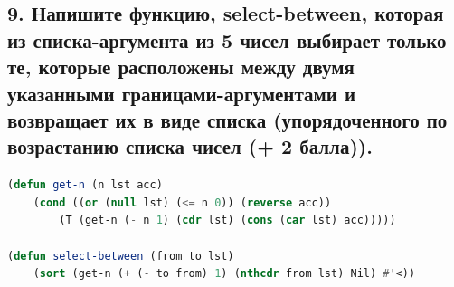 \documentclass[12pt]{report}
\begin{document}
\subsection*{9. Напишите функцию, select-between, которая из списка-аргумента из 5 чисел выбирает
	только те, которые расположены между двумя указанными границами-аргументами и
	возвращает их в виде списка (упорядоченного по возрастанию списка чисел (+ 2 балла)).}

\begin{lstlisting}[label=6xd, caption=Решение задания №9, language=lisp]
(defun get-n (n lst acc)
	(cond ((or (null lst) (<= n 0)) (reverse acc))
		(T (get-n (- n 1) (cdr lst) (cons (car lst) acc)))))

(defun select-between (from to lst)
	(sort (get-n (+ (- to from) 1) (nthcdr from lst) Nil) #'<))

\end{lstlisting}
\end{document}
